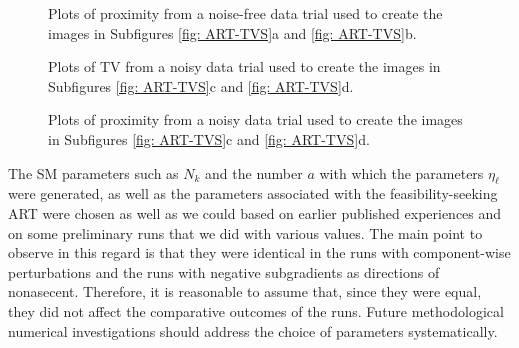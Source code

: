 \documentclass[smallextended]{svjour3}      %
\begin{document}
\begin{figure}
	\centering
	\caption{Plots of proximity from a noise-free data trial used to create the images in Subfigures \ref{fig: ART-TVS}a and \ref{fig: ART-TVS}b.
	\label{fig: Proximity-plots-noise-free}}
\end{figure}

\begin{figure}
	\centering
	\caption{Plots of TV from a noisy data trial used to create the images in Subfigures \ref{fig: ART-TVS}c and \ref{fig: ART-TVS}d.
	\label{fig: TV-plots-noisy}}
\end{figure}

\begin{figure}
	\centering
	\caption{Plots of proximity from a noisy data trial used to create the images in Subfigures \ref{fig: ART-TVS}c and \ref{fig: ART-TVS}d.
	\label{fig: Proximity-plots-noisy}}
\end{figure}

\begin{remark} The SM parameters such as $N_{k}$ and the number $a$ with which the parameters $\eta_\ell$ were generated, as well as the parameters associated with the feasibility-seeking ART were chosen as well as we could based on earlier published experiences and on some preliminary runs that we did with various values. The main point to observe in this regard is that they were identical in the runs with component-wise perturbations and the runs with negative subgradients as directions of nonasecent. Therefore, it is reasonable to assume that, since they were equal, they did not affect the comparative outcomes of the runs. Future methodological numerical investigations should address the choice of parameters systematically.
\end{remark}
\end{document}
